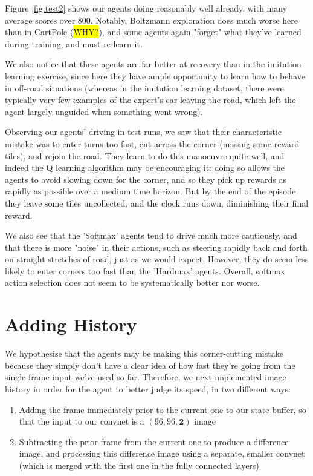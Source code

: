 \documentclass[a4paper, 11pt, conference]{ieeeconf}      %
\begin{document}
Figure \ref{fig:test2} shows our agents doing reasonably well already, with many average scores over 800. Notably, Boltzmann exploration does much worse here than in CartPole (\colorbox{yellow}{WHY?}), and some agents again "forget" what they've learned during training, and must re-learn it.

We also notice that these agents are far better at recovery than in the imitation learning exercise, since here they have ample opportunity to learn how to behave in off-road situations (whereas in the imitation learning dataset, there were typically very few examples of the expert's car leaving the road, which left the agent largely unguided when something went wrong).

Observing our agents' driving in test runs, we saw that their characteristic mistake was to enter turns too fast, cut across the corner (missing some reward tiles), and rejoin the road. They learn to do this manoeuvre quite well, and indeed the Q learning algorithm may be encouraging it: doing so allows the agents to avoid slowing down for the corner, and so they pick up rewards as rapidly as possible over a medium time horizon. But by the end of the episode they leave some tiles uncollected, and the clock runs down, diminishing their final reward.

We also see that the 'Softmax' agents tend to drive much more cautiously, and that there is more "noise" in their actions, such as steering rapidly back and forth on straight stretches of road, just as we would expect. However, they do seem less likely to enter corners too fast than the 'Hardmax' agents. Overall, softmax action selection does not seem to be systematically better nor worse.

\section{Adding History}

We hypothesise that the agents may be making this corner-cutting mistake because they simply don't have a clear idea of how fast they're going from the single-frame input we've used so far. Therefore, we next implemented image history in order for the agent to better judge its speed, in two different ways:

\begin{enumerate}
	\item Adding the frame immediately prior to the current one to our state buffer, so that the input to our convnet is a $(96, 96, \textbf{2})$ image

	\item Subtracting the prior frame from the current one to produce a difference image, and processing this difference image using a separate, smaller convnet (which is merged with the first one in the fully connected layers)
\end{enumerate}
\end{document}
